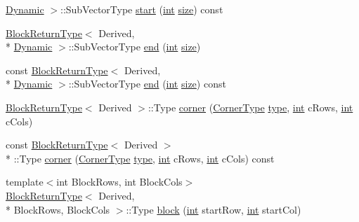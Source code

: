 \begin{DoxyCompactItemize}
\hyperlink{_constants_8h_adc9da5be31bdce40c25a92c27999c0e3}{Dynamic} $>$\-::Sub\-Vector\-Type \hyperlink{class_matrix_base_a96eaf19269e370473559a1902e652895}{start} (\hyperlink{ioapi_8h_a787fa3cf048117ba7123753c1e74fcd6}{int} \hyperlink{glext_8h_a014d89bd76f74ef3a29c8f04b473eb76}{size}) const 
\item 
\hyperlink{struct_block_return_type}{Block\-Return\-Type}$<$ Derived, \\*
\hyperlink{_constants_8h_adc9da5be31bdce40c25a92c27999c0e3}{Dynamic} $>$\-::Sub\-Vector\-Type \hyperlink{class_matrix_base_a82c66eacf20e57c448ab83d3f4b7fcab}{end} (\hyperlink{ioapi_8h_a787fa3cf048117ba7123753c1e74fcd6}{int} \hyperlink{glext_8h_a014d89bd76f74ef3a29c8f04b473eb76}{size})
\item 
const \hyperlink{struct_block_return_type}{Block\-Return\-Type}$<$ Derived, \\*
\hyperlink{_constants_8h_adc9da5be31bdce40c25a92c27999c0e3}{Dynamic} $>$\-::Sub\-Vector\-Type \hyperlink{class_matrix_base_abf0a918cdf15e044d2d0e78bb0cb232f}{end} (\hyperlink{ioapi_8h_a787fa3cf048117ba7123753c1e74fcd6}{int} \hyperlink{glext_8h_a014d89bd76f74ef3a29c8f04b473eb76}{size}) const 
\item 
\hyperlink{struct_block_return_type}{Block\-Return\-Type}$<$ Derived $>$\-::Type \hyperlink{class_matrix_base_aa7c838adc008493048e33a2d85cc5356}{corner} (\hyperlink{_constants_8h_a550469de139cb6f1605cb7cb2bbc79db}{Corner\-Type} \hyperlink{glext_8h_a7d05960f4f1c1b11f3177dc963a45d86}{type}, \hyperlink{ioapi_8h_a787fa3cf048117ba7123753c1e74fcd6}{int} c\-Rows, \hyperlink{ioapi_8h_a787fa3cf048117ba7123753c1e74fcd6}{int} c\-Cols)
\item 
const \hyperlink{struct_block_return_type}{Block\-Return\-Type}$<$ Derived $>$\\*
\-::Type \hyperlink{class_matrix_base_a336b53a11d51d4202be3223ec653ac74}{corner} (\hyperlink{_constants_8h_a550469de139cb6f1605cb7cb2bbc79db}{Corner\-Type} \hyperlink{glext_8h_a7d05960f4f1c1b11f3177dc963a45d86}{type}, \hyperlink{ioapi_8h_a787fa3cf048117ba7123753c1e74fcd6}{int} c\-Rows, \hyperlink{ioapi_8h_a787fa3cf048117ba7123753c1e74fcd6}{int} c\-Cols) const 
\item 
{\footnotesize template$<$int Block\-Rows, int Block\-Cols$>$ }\\\hyperlink{struct_block_return_type}{Block\-Return\-Type}$<$ Derived, \\*
Block\-Rows, Block\-Cols $>$\-::Type \hyperlink{class_matrix_base_ab2e414b1e693a17c6e6b23229ad364cc}{block} (\hyperlink{ioapi_8h_a787fa3cf048117ba7123753c1e74fcd6}{int} start\-Row, \hyperlink{ioapi_8h_a787fa3cf048117ba7123753c1e74fcd6}{int} start\-Col)

\end{DoxyCompactItemize}
